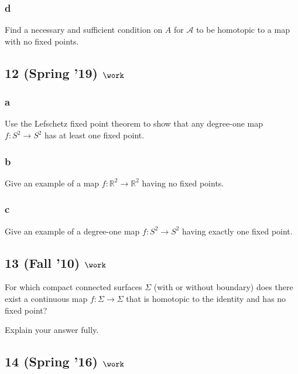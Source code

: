 \hypertarget{d}{%
\subsubsection{d}\label{d}}

Find a necessary and sufficient condition on \(A\) for \({\mathcal{A}}\)
to be homotopic to a map with no fixed points.

\hypertarget{spring-19-work-3}{%
\subsection{\texorpdfstring{12 (Spring '19)
\(\work\)}{12 (Spring '19) \textbackslash work}}\label{spring-19-work-3}}

\hypertarget{a-7}{%
\subsubsection{a}\label{a-7}}

Use the Lefschetz fixed point theorem to show that any degree-one map
\(f : S^2 \to S^2\) has at least one fixed point.

\hypertarget{b-7}{%
\subsubsection{b}\label{b-7}}

Give an example of a map \(f : {\mathbb{R}}^2 \to {\mathbb{R}}^2\)
having no fixed points.

\hypertarget{c-3}{%
\subsubsection{c}\label{c-3}}

Give an example of a degree-one map \(f : S^2 \to S^2\) having exactly
one fixed point.

\hypertarget{fall-10-work-3}{%
\subsection{\texorpdfstring{13 (Fall '10)
\(\work\)}{13 (Fall '10) \textbackslash work}}\label{fall-10-work-3}}

For which compact connected surfaces \(\Sigma\) (with or without
boundary) does there exist a continuous map \(f : \Sigma \to \Sigma\)
that is homotopic to the identity and has no fixed point?

Explain your answer fully.

\hypertarget{spring-16-work-3}{%
\subsection{\texorpdfstring{14 (Spring '16)
\(\work\)}{14 (Spring '16) \textbackslash work}}\label{spring-16-work-3}}

